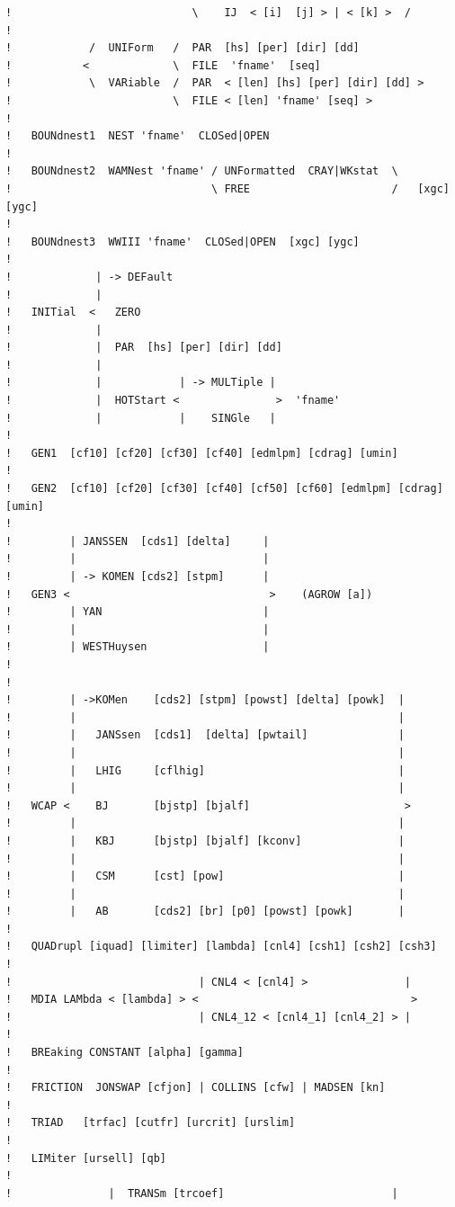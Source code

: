 \documentclass[12pt]{book}
\begin{document}
\begin{verbatim}
!                            \    IJ  < [i]  [j] > | < [k] >  /
!
!            /  UNIForm   /  PAR  [hs] [per] [dir] [dd]
!           <             \  FILE  'fname'  [seq]
!            \  VARiable  /  PAR  < [len] [hs] [per] [dir] [dd] >
!                         \  FILE < [len] 'fname' [seq] >
!
!   BOUNdnest1  NEST 'fname'  CLOSed|OPEN
!
!   BOUNdnest2  WAMNest 'fname' / UNFormatted  CRAY|WKstat  \
!                               \ FREE                      /   [xgc] [ygc]
!
!   BOUNdnest3  WWIII 'fname'  CLOSed|OPEN  [xgc] [ygc]
!
!             | -> DEFault
!             |
!   INITial  <   ZERO
!             |
!             |  PAR  [hs] [per] [dir] [dd]
!             |
!             |            | -> MULTiple |
!             |  HOTStart <               >  'fname'
!             |            |    SINGle   |
!
!   GEN1  [cf10] [cf20] [cf30] [cf40] [edmlpm] [cdrag] [umin]
!
!   GEN2  [cf10] [cf20] [cf30] [cf40] [cf50] [cf60] [edmlpm] [cdrag] [umin]
!
!         | JANSSEN  [cds1] [delta]     |
!         |                             |
!         | -> KOMEN [cds2] [stpm]      |
!   GEN3 <                               >    (AGROW [a])
!         | YAN                         |
!         |                             |
!         | WESTHuysen                  |
!
!
!         | ->KOMen    [cds2] [stpm] [powst] [delta] [powk]  |
!         |                                                  |
!         |   JANSsen  [cds1]  [delta] [pwtail]              |
!         |                                                  |
!         |   LHIG     [cflhig]                              |
!         |                                                  |
!   WCAP <    BJ       [bjstp] [bjalf]                        >
!         |                                                  |
!         |   KBJ      [bjstp] [bjalf] [kconv]               |
!         |                                                  |
!         |   CSM      [cst] [pow]                           |
!         |                                                  |
!         |   AB       [cds2] [br] [p0] [powst] [powk]       |
!
!   QUADrupl [iquad] [limiter] [lambda] [cnl4] [csh1] [csh2] [csh3]
!
!                             | CNL4 < [cnl4] >               |
!   MDIA LAMbda < [lambda] > <                                 >
!                             | CNL4_12 < [cnl4_1] [cnl4_2] > |
!
!   BREaking CONSTANT [alpha] [gamma]
!
!   FRICTION  JONSWAP [cfjon] | COLLINS [cfw] | MADSEN [kn]
!
!   TRIAD   [trfac] [cutfr] [urcrit] [urslim]
!
!   LIMiter [ursell] [qb]
!
!               |  TRANSm [trcoef]                          |

\end{verbatim}
\end{document}
